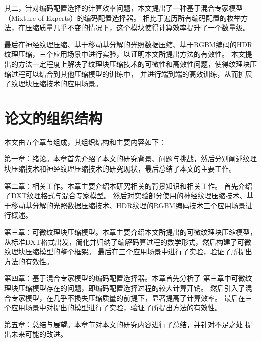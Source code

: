其二，针对编码配置选择的计算效率问题，本文提出了一种基于混合专家模型（Mixture of Experts）的编码配置选择器。
相比于遍历所有编码配置的枚举方法，在压缩质量几乎不变的情况下，这个模块使得计算效率提升了一个数量级。

最后在神经纹理压缩\cite{weinreich2024real}、基于移动基分解的光照数据压缩\cite{silvennoinen2021moving}、基于RGBM编码的HDR纹理压缩，三个应用场景中进行实验，以证明本文所提出方法的有效性。
本文提出的方法一定程度上解决了纹理块压缩技术的可微性和高效性问题，使得纹理块压缩过程可以结合到其他压缩模型的训练中，
并进行端到端的高效训练，从而扩展了纹理块压缩技术的应用场景。

\section{论文的组织结构}

本文由五个章节组成，其组织结构和主要内容如下：

第一章：绪论。本章首先介绍了本文的研究背景、问题与挑战，然后分别阐述纹理
块压缩技术和神经纹理压缩技术的研究现状，最后总结了本文的主要工作。

第二章：相关工作。本章主要介绍本研究相关的背景知识和相关工作。
首先介绍了DXT纹理格式与混合专家模型。
然后对实验部分使用的神经纹理压缩技术、基于移动基分解的光照数据压缩技术、HDR纹理的RGBM编码技术三个应用场景进行概述。

第三章：可微纹理块压缩模型。本章主要介绍本文所提出的可微纹理块压缩模型，
从标准DXT格式出发，简化并归纳了编解码算过程的数学形式，然后构建了可微纹理块压缩模型的整个框架。
最后在三个应用场景中进行了实验，验证了所提出方法的有效性。

第四章：基于混合专家模型的编码配置选择器。本章首先分析了
第三章中可微纹理块压缩模型存在的问题，即编码配置选择过程的较大计算开销。
然后引入了混合专家模型，在几乎不损失压缩质量的前提下，显著提高了计算效率。
最后在三个应用场景中对提出的模型进行了实验，验证了所提出方法的有效性。

第五章：总结与展望。本章节对本文的研究内容进行了总结，并针对不足之处
提出未来可能的改进。

